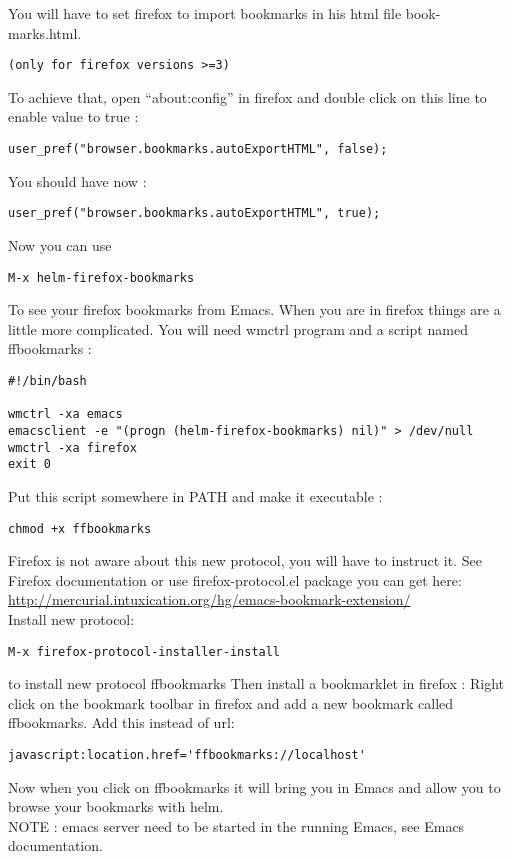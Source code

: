 \documentclass[a4paper,11pt]{article}
\begin{document}
You will have to set firefox to import bookmarks in his html file book-marks.html. 
\begin{verbatim}
(only for firefox versions >=3)
\end{verbatim}
To achieve that, open ``about:config'' in firefox and double click on this line to enable value to true :
\begin{verbatim}
user_pref("browser.bookmarks.autoExportHTML", false);
\end{verbatim}
You should have now :
\begin{verbatim}
user_pref("browser.bookmarks.autoExportHTML", true);
\end{verbatim}
Now you can use
\begin{verbatim}
M-x helm-firefox-bookmarks
\end{verbatim}
To see your firefox bookmarks from Emacs.
When you are in firefox things are a little more complicated. You will
need wmctrl program and a script named ffbookmarks :
\begin{verbatim}
#!/bin/bash

wmctrl -xa emacs
emacsclient -e "(progn (helm-firefox-bookmarks) nil)" > /dev/null
wmctrl -xa firefox
exit 0
\end{verbatim}
Put this script somewhere in PATH and make it executable :
\begin{verbatim}
chmod +x ffbookmarks
\end{verbatim}

Firefox is not aware about this new protocol, you will have to instruct
it. See Firefox documentation or use firefox-protocol.el package you can get
here: \\
\url{http://mercurial.intuxication.org/hg/emacs-bookmark-extension/} \\
Install new protocol: \\
\begin{verbatim}
M-x firefox-protocol-installer-install
\end{verbatim}
to install new protocol ffbookmarks
Then install a bookmarklet in firefox : Right click on the bookmark
toolbar in firefox and add a new bookmark called ffbookmarks. Add this
instead of url: \\
\begin{verbatim}
javascript:location.href='ffbookmarks://localhost'
\end{verbatim}

Now when you click on ffbookmarks it will bring you in Emacs and allow
you to browse your bookmarks with helm.
\\
NOTE : emacs server need to be started in the running Emacs, see Emacs
documentation.
\end{document}

